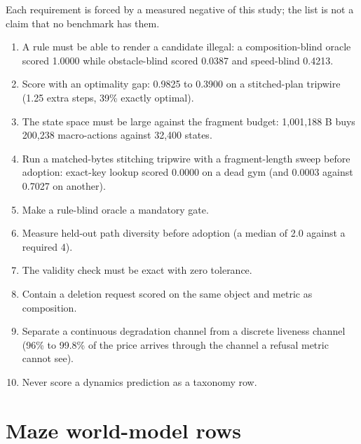 \documentclass{article} %
\begin{document}
Each requirement is forced by a measured negative of this study; the list is not a claim that
no benchmark has them. %
\begin{enumerate}[leftmargin=*,itemsep=1pt]
\item A rule must be able to render a candidate illegal: a composition-blind oracle scored 1.0000
  while obstacle-blind scored 0.0387 and speed-blind 0.4213. %
\item Score with an optimality gap: 0.9825 to 0.3900 on a stitched-plan tripwire (1.25 extra steps,
  39\% exactly optimal). %
\item The state space must be large against the fragment budget: 1,001,188 B buys 200,238
  macro-actions against 32,400 states. %
\item Run a matched-bytes stitching tripwire with a fragment-length sweep before adoption: exact-key
  lookup scored 0.0000 on a dead gym (and 0.0003 against 0.7027 on another).
\item Make a rule-blind oracle a mandatory gate.
\item Measure held-out path diversity before adoption (a median of 2.0 against a required 4).
\item The validity check must be exact with zero tolerance.
\item Contain a deletion request scored on the same object and metric as composition.
\item Separate a continuous degradation channel from a discrete liveness channel (96\% to 99.8\% of
  the price arrives through the channel a refusal metric cannot see). %
\item Never score a dynamics prediction as a taxonomy row.
\end{enumerate}

\section{Maze world-model rows}
\label{app:mazewm}
\end{document}
